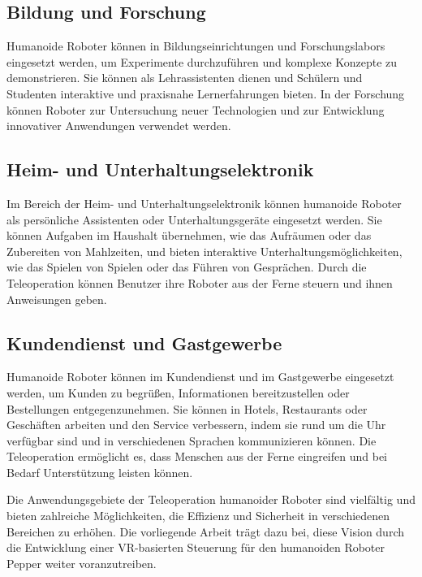 \subsection{Bildung und Forschung}
Humanoide Roboter können in Bildungseinrichtungen und Forschungslabors eingesetzt werden, um Experimente durchzuführen und komplexe Konzepte zu demonstrieren. Sie können als Lehrassistenten dienen und Schülern und Studenten interaktive und praxisnahe Lernerfahrungen bieten. In der Forschung können Roboter zur Untersuchung neuer Technologien und zur Entwicklung innovativer Anwendungen verwendet werden.

\subsection{Heim- und Unterhaltungselektronik}
Im Bereich der Heim- und Unterhaltungselektronik können humanoide Roboter als persönliche Assistenten oder Unterhaltungsgeräte eingesetzt werden. Sie können Aufgaben im Haushalt übernehmen, wie das Aufräumen oder das Zubereiten von Mahlzeiten, und bieten interaktive Unterhaltungsmöglichkeiten, wie das Spielen von Spielen oder das Führen von Gesprächen. Durch die Teleoperation können Benutzer ihre Roboter aus der Ferne steuern und ihnen Anweisungen geben.

\subsection{Kundendienst und Gastgewerbe}
Humanoide Roboter können im Kundendienst und im Gastgewerbe eingesetzt werden, um Kunden zu begrüßen, Informationen bereitzustellen oder Bestellungen entgegenzunehmen. Sie können in Hotels, Restaurants oder Geschäften arbeiten und den Service verbessern, indem sie rund um die Uhr verfügbar sind und in verschiedenen Sprachen kommunizieren können. Die Teleoperation ermöglicht es, dass Menschen aus der Ferne eingreifen und bei Bedarf Unterstützung leisten können.

Die Anwendungsgebiete der Teleoperation humanoider Roboter sind vielfältig und bieten zahlreiche Möglichkeiten, die Effizienz und Sicherheit in verschiedenen Bereichen zu erhöhen. Die vorliegende Arbeit trägt dazu bei, diese Vision durch die Entwicklung einer VR-basierten Steuerung für den humanoiden Roboter Pepper weiter voranzutreiben.

